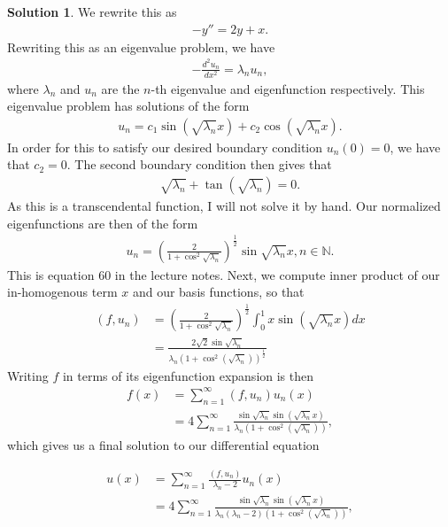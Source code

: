\documentclass[12pt]{article}
\newcommand{\bbN}{\mathbb{N}}
\theoremstyle{definition}
\newtheorem{sol}{Solution}
\theoremstyle{remark}
\begin{document}
\begin{sol}
We rewrite this as
\begin{align*}
-y'' = 2y + x.
\end{align*}
Rewriting this as an eigenvalue problem, we have
\begin{align*}
    - \frac{d^{2}u_{n}}{dx^{2}} = \lambda_{n} u_{n},
\end{align*}
where $\lambda_{n}$ and $u_{n}$ are the $n$-th eigenvalue and eigenfunction respectively. This eigenvalue problem has solutions of the form
\begin{align*}
    u_{n} = c_{1} \sin (\sqrt{\lambda_{n}} x) + c_{2} \cos (\sqrt{\lambda_{n}} x).
\end{align*}
In order for this to satisfy our desired boundary condition $u_{n}(0) = 0$, we have that $c_{2} = 0$. The second boundary condition then gives that
\begin{align*}
    \sqrt{\lambda_{n}} + \tan(\sqrt{\lambda_{n}}) = 0.
\end{align*}
As this is a transcendental function, I will not solve it by hand. Our normalized eigenfunctions are then of the form
\begin{align*}
    u_{n} = \left(\frac{2}{1 + \cos^{2} \sqrt{\lambda_{n}}}\right)^{\frac{1}{2}} \sin \sqrt{\lambda_{n}} x, n \in \bbN.
\end{align*}
This is equation 60 in the lecture notes. Next, we compute inner product of our in-homogenous term $x$ and our basis functions, so that 
\begin{align*}
    (f, u_{n}) &=  \left(\frac{2}{1 + \cos^{2} \sqrt{\lambda_{n}}}\right)^{\frac{1}{2}} \int_{0}^{1} x \sin(\sqrt{\lambda_{n}} x) dx\\
                       &= \frac{2\sqrt{2} \sin \sqrt{\lambda_{n}}}{\lambda_{n} (1 + \cos^{2}(\sqrt{\lambda_{n}}))^{\frac{1}{2}}}
\end{align*}
Writing $f$ in terms of its eigenfunction expansion is then
\begin{align*}
    f(x) &= \sum_{n=1}^{\infty}  (f, u_{n}) u_{n}(x) \\
         &= 4 \sum_{n=1}^{\infty} \frac{\sin \sqrt{\lambda_{n}} \sin( \sqrt{\lambda_{n}} x )}{\lambda_{n} (1 + \cos^{2}(\sqrt{\lambda_{n}}))},
\end{align*}
which gives us a final solution to our differential equation
\end{sol}
\begin{align*}
    u(x) &= \sum_{n=1}^{\infty} \frac{(f, u_{n})}{\lambda_{n} - 2} u_{n}(x)\\
         &= 4 \sum_{n=1}^{\infty} \frac{\sin \sqrt{\lambda_{n}} \sin( \sqrt{\lambda_{n}} x )}{\lambda_{n} (\lambda_{n} - 2) (1 + \cos^{2}(\sqrt{\lambda_{n}}))},
\end{align*}
\newpage
\end{document}
